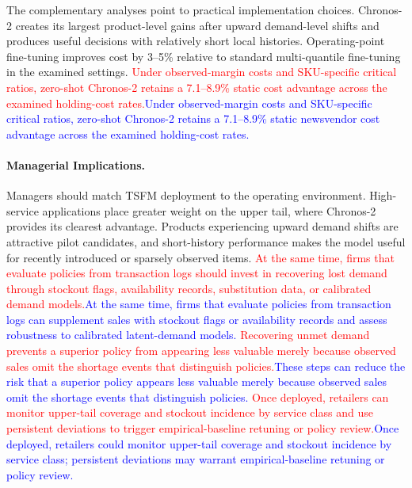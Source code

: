 \documentclass[msom,dblanonrev]{informs4}
\newcommand{\add}[1]{\textcolor{blue}{#1}}
\newcommand{\reduce}[1]{\textcolor{red}{#1}\hspace{0.5em}}
\begin{document}
The complementary analyses point to practical implementation choices.
Chronos-2 creates its largest product-level gains after upward demand-level shifts and produces useful decisions with relatively short local histories.
Operating-point fine-tuning improves cost by 3--5\% relative to standard multi-quantile fine-tuning in the examined settings.
\reduce{Under observed-margin costs and SKU-specific critical ratios, zero-shot Chronos-2 retains a 7.1--8.9\% static cost advantage across the examined holding-cost rates.}\add{Under observed-margin costs and SKU-specific critical ratios, zero-shot Chronos-2 retains a 7.1--8.9\% static newsvendor cost advantage across the examined holding-cost rates.}
\paragraph{Managerial Implications.}
Managers should match TSFM deployment to the operating environment.
High-service applications place greater weight on the upper tail, where Chronos-2 provides its clearest advantage.
Products experiencing upward demand shifts are attractive pilot candidates, and short-history performance makes the model useful for recently introduced or sparsely observed items.
\reduce{At the same time, firms that evaluate policies from transaction logs should invest in recovering lost demand through stockout flags, availability records, substitution data, or calibrated demand models.}\add{At the same time, firms that evaluate policies from transaction logs can supplement sales with stockout flags or availability records and assess robustness to calibrated latent-demand models.}
\reduce{Recovering unmet demand prevents a superior policy from appearing less valuable merely because observed sales omit the shortage events that distinguish policies.}\add{These steps can reduce the risk that a superior policy appears less valuable merely because observed sales omit the shortage events that distinguish policies.}
\reduce{Once deployed, retailers can monitor upper-tail coverage and stockout incidence by service class and use persistent deviations to trigger empirical-baseline retuning or policy review.}\add{Once deployed, retailers could monitor upper-tail coverage and stockout incidence by service class; persistent deviations may warrant empirical-baseline retuning or policy review.}
\end{document}
